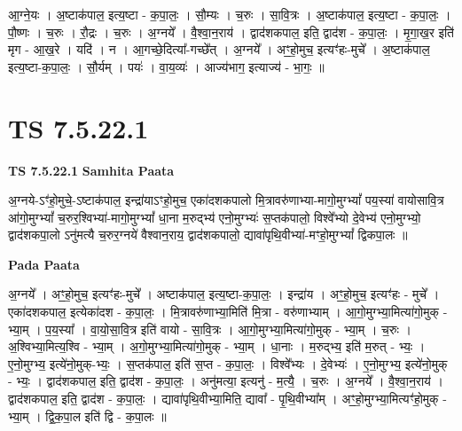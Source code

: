 \documentclass[17pt]{extarticle}
\begin{document}
आ॒ग्ने॒यः । अ॒ष्टाक॑पाल॒ इत्य॒ष्टा - क॒पा॒लः॒ । सौ॒म्यः । च॒रुः । सा॒वि॒त्रः । अ॒ष्टाक॑पाल॒ इत्य॒ष्टा - क॒पा॒लः॒ । पौ॒ष्णः । च॒रुः । रौ॒द्रः । च॒रुः । अ॒ग्नये᳚ । वै॒श्वा॒न॒राय॑ । द्वाद॑शकपाल॒ इति॒ द्वाद॑श - क॒पा॒लः॒ । मृ॒गा॒ख॒र इति॑ मृग - आ॒ख॒रे । यदि॑ । न । आ॒गच्छे॒दित्या᳚-गच्छे᳚त् । अ॒ग्नये᳚ । अꣳ॒॒हो॒मुच॒ इत्यꣳ॑हः-मुचे᳚ । अ॒ष्टाक॑पाल॒ इत्य॒ष्टा-क॒पा॒लः॒ । सौ॒र्यम् । पयः॑ । वा॒य॒व्यः॑ । आज्य॑भाग॒ इत्याज्य॑ - भा॒गः॒ ॥  \newline





\section{ TS 7.5.22.1 }

\textbf{TS 7.5.22.1 } \newline
\textbf{Samhita Paata} \newline

अ॒ग्नये-ऽꣳ॑हो॒मुचे॒-ऽष्टाक॑पाल॒ इन्द्रा॑याऽꣳहो॒मुच॒ एका॑दशकपालो मि॒त्रावरु॑णाभ्या-मागो॒मुग्भ्यां᳚ पय॒स्या॑ वायोसावि॒त्र आ॑गो॒मुग्भ्यां᳚ च॒रुर॒श्विभ्या॑-मागो॒मुग्भ्यां᳚ धा॒ना म॒रुद्भ्य॑ एनो॒मुग्भ्यः॑ स॒प्तक॑पालो॒ विश्वे᳚भ्यो दे॒वेभ्य॑ एनो॒मुग्भ्यो॒ द्वाद॑शकपा॒लो ऽनु॑मत्यै च॒रुर॒ग्नये॑ वैश्वान॒राय॒ द्वाद॑शकपालो॒ द्यावा॑पृथि॒वीभ्या॑-मꣳहो॒मुग्भ्यां᳚ द्विकपा॒लः ॥ \newline

\textbf{Pada Paata} \newline

अ॒ग्नये᳚ । अꣳ॒॒हो॒मुच॒ इत्यꣳ॑हः-मुचे᳚ । अष्टाक॑पाल॒ इत्य॒ष्टा-क॒पा॒लः॒ । इन्द्रा॑य । अꣳ॒॒हो॒मुच॒ इत्यꣳ॑हः - मुचे᳚ । एका॑दशकपाल॒ इत्येका॑दश - क॒पा॒लः॒ । मि॒त्रावरु॑णाभ्या॒मिति॑ मि॒त्रा - वरु॑णाभ्याम् । आ॒गो॒मुग्भ्या॒मित्या॑गो॒मुक् - भ्या॒म् । प॒य॒स्या᳚ । वा॒यो॒सा॒वि॒त्र इति॑ वायो - सा॒वि॒त्रः । आ॒गो॒मुग्भ्या॒मित्या॑गो॒मुक् - भ्या॒म् । च॒रुः । अ॒श्विभ्या॒मित्य॒श्वि - भ्या॒म् । अ॒गो॒मुग्भ्या॒मित्या॑गो॒मुक् - भ्या॒म् । धा॒नाः । म॒रुद्भ्य॒ इति॑ म॒रुत् - भ्यः॒ । ए॒नो॒मुग्भ्य॒ इत्ये॑नो॒मुक्-भ्यः॒ । स॒प्तक॑पाल॒ इति॑ स॒प्त - क॒पा॒लः॒ । विश्वे᳚भ्यः । दे॒वेभ्यः॑ । ए॒नो॒मुग्भ्य॒ इत्ये॑नो॒मुक् - भ्यः॒ । द्वाद॑शकपाल॒ इति॒ द्वाद॑श - क॒पा॒लः॒ । अनु॑मत्या॒ इत्यनु॑ - म॒त्यै॒ । च॒रुः । अ॒ग्नये᳚ । वै॒श्वा॒न॒राय॑ । द्वाद॑शकपाल॒ इति॒ द्वाद॑श - क॒पा॒लः॒ । द्यावा॑पृथि॒वीभ्या॒मिति॒ द्यावा᳚ - पृ॒थि॒वीभ्या᳚म् । अꣳ॒॒हो॒मुग्भ्या॒मित्यꣳ॑हो॒मुक् - भ्या॒म् । द्वि॒क॒पा॒ल इति॑ द्वि - क॒पा॒लः ॥  \newline
\end{document}
